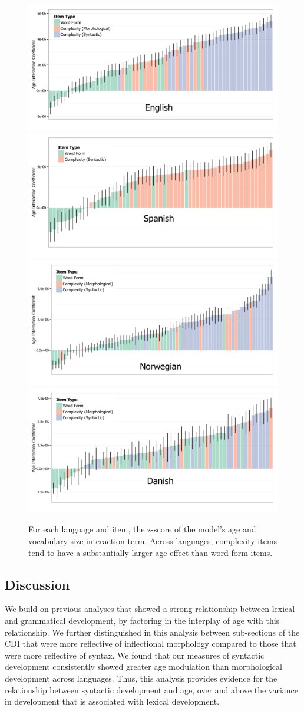 \documentclass[10pt,letterpaper]{article}
\begin{document}

\begin{figure}[t]
\centering
\includegraphics[width=.49\textwidth]{plots/english_interactions}
\includegraphics[width=.49\textwidth]{plots/spanish_interactions} \\
\includegraphics[width=.49\textwidth]{plots/norwegian_interactions}
\includegraphics[width=.49\textwidth]{plots/danish_interactions}
\caption{\label{fig:interactions} For each language and item, the z-score of the model's age and vocabulary size interaction term. Across languages, complexity items tend to have a substantially larger age effect than word form items.}
\end{figure}

\subsection{Discussion}

We build on previous analyses that showed a strong relationship between lexical and grammatical development, by factoring in the interplay of age with this relationship. We further distinguished in this analysis between sub-sections of the CDI that were more reflective of inflectional morphology compared to those that were more reflective of syntax.  We found that our measures of syntactic development consistently showed greater age modulation than morphological development across languages. Thus, this analysis provides evidence for the relationship between syntactic development and age, over and above the variance in development that is associated with lexical development. 
\end{document}
